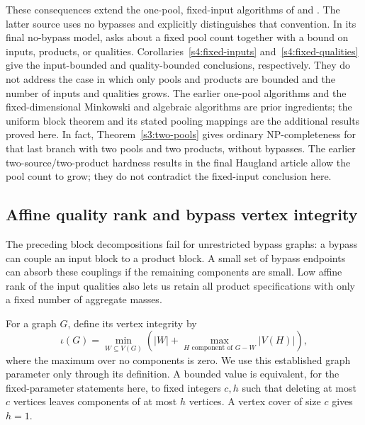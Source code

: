 These consequences extend the one-pool, fixed-input algorithms of
\citet[Theorem~1]{s4:boland2017} and
\citet[Theorem~4.1]{s3:haugland-hendrix2016}. The latter source uses
no bypasses and explicitly distinguishes that convention. In its final
no-bypass model, \citet[Section~6, p.~214]
{haugland2016-the-computational-complexity-of-the} asks about a fixed
pool count together with a bound on inputs, products, or qualities.
Corollaries~\ref{s4:fixed-inputs} and~\ref{s4:fixed-qualities} give the
input-bounded and quality-bounded conclusions, respectively.
They do not address the case in which only pools and products are
bounded and the number of inputs and qualities grows. The earlier
one-pool algorithms and the fixed-dimensional Minkowski and algebraic
algorithms are prior ingredients; the uniform block theorem and its
stated pooling mappings are the additional results proved here.
In fact, Theorem~\ref{s3:two-pools} gives ordinary NP-completeness for
that last branch with two pools and two products, without bypasses.
The earlier two-source/two-product hardness results in the final
Haugland article allow the pool count to grow; they do not contradict
the fixed-input conclusion here.

\subsection{Affine quality rank and bypass vertex integrity}
\label{s4:bypass-structure}

The preceding block decompositions fail for unrestricted bypass graphs:
a bypass can couple an input block to a product block. A small set of
bypass endpoints can absorb these couplings if the remaining components
are small. Low affine rank of the input qualities also lets us retain
all product specifications with only a fixed number of aggregate masses.

For a graph $G$, define its vertex integrity by
\[
 \iota(G)=\min_{W\subseteq V(G)}
 \left(|W|+\max_{H\text{ component of }G-W}|V(H)|\right),
\]
where the maximum over no components is zero. We use this established
graph parameter only through its definition. A bounded value is
equivalent, for the fixed-parameter statements here, to fixed integers
$c,h$ such that deleting at most $c$ vertices leaves components of at
most $h$ vertices. A vertex cover of size $c$ gives $h=1$.

